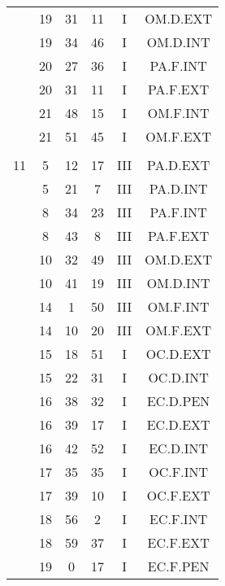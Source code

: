 \documentclass[12pt, a4paper]{article}
\begin{document}
\begin{multicols}{3}
{\begin{tabular}{c c c c c c}
	 	 	 	 & 19 & 31 & 11 & I & OM.D.EXT\\%
	 	 	 	 & 19 & 34 & 46 & I & OM.D.INT\\%
	 	 	 	 & 20 & 27 & 36 & I & PA.F.INT\\%
	 	 	 	 & 20 & 31 & 11 & I & PA.F.EXT\\%
	 	 	 	 & 21 & 48 & 15 & I & OM.F.INT\\%
	 	 	 	 & 21 & 51 & 45 & I & OM.F.EXT\\%
	 	 	 	 & & & & & \\%
	 	 	 	11 & 5 & 12 & 17 & III & PA.D.EXT\\%
	 	 	 	 & 5 & 21 & 7 & III & PA.D.INT\\%
	 	 	 	 & 8 & 34 & 23 & III & PA.F.INT\\%
	 	 	 	 & 8 & 43 & 8 & III & PA.F.EXT\\%
	 	 	 	 & 10 & 32 & 49 & III & OM.D.EXT\\%
	 	 	 	 & 10 & 41 & 19 & III & OM.D.INT\\%
	 	 	 	 & 14 & 1 & 50 & III & OM.F.INT\\%
	 	 	 	 & 14 & 10 & 20 & III & OM.F.EXT\\%
	 	 	 	 & 15 & 18 & 51 & I & OC.D.EXT\\%
	 	 	 	 & 15 & 22 & 31 & I & OC.D.INT\\%
	 	 	 	 & 16 & 38 & 32 & I & EC.D.PEN\\%
	 	 	 	 & 16 & 39 & 17 & I & EC.D.EXT\\%
	 	 	 	 & 16 & 42 & 52 & I & EC.D.INT\\%
	 	 	 	 & 17 & 35 & 35 & I & OC.F.INT\\%
	 	 	 	 & 17 & 39 & 10 & I & OC.F.EXT\\%
	 	 	 	 & 18 & 56 & 2 & I & EC.F.INT\\%
	 	 	 	 & 18 & 59 & 37 & I & EC.F.EXT\\%
	 	 	 	 & 19 & 0 & 17 & I & EC.F.PEN\\%
	 	 \end{tabular}
 	}
\end{multicols}
\end{document}
